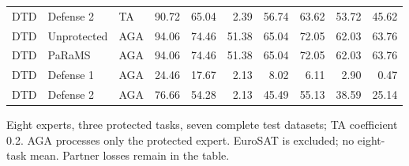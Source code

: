\begin{table}[t]
\begin{tabular}{@{}lllrrrrrrr@{}}
DTD & Defense 2 & TA & 90.72 & 65.04 & 2.39 & 56.74 & 63.62 & 53.72 & 45.62 \\
\addlinespace
DTD & Unprotected & AGA & 94.06 & 74.46 & 51.38 & 65.04 & 72.05 & 62.03 & 63.76 \\
DTD & PaRaMS & AGA & 94.06 & 74.46 & 51.38 & 65.04 & 72.05 & 62.03 & 63.76 \\
DTD & Defense 1 & AGA & 24.46 & 17.67 & 2.13 & 8.02 & 6.11 & 2.90 & 0.47 \\
DTD & Defense 2 & AGA & 76.66 & 54.28 & 2.13 & 45.49 & 55.13 & 38.59 & 25.14 \\
\bottomrule
\end{tabular}
\par\smallskip
\begin{minipage}{\textwidth}\footnotesize Eight experts, three protected tasks, seven complete test datasets; TA coefficient 0.2. AGA processes only the protected expert. EuroSAT is excluded; no eight-task mean. Partner losses remain in the table.\end{minipage}
\end{table}
